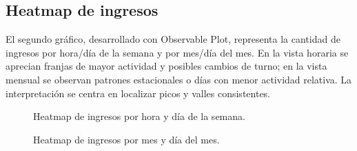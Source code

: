 \subsection{Heatmap de ingresos}
El segundo gráfico, desarrollado con Observable Plot, representa la cantidad de ingresos por hora/día de la semana y por mes/día del mes. En la vista horaria se aprecian franjas de mayor actividad y posibles cambios de turno; en la vista mensual se observan patrones estacionales o días con menor actividad relativa. La interpretación se centra en localizar picos y valles consistentes.
\begin{figure}[H]
  \centering
  \caption{Heatmap de ingresos por hora y día de la semana.}
  \label{fig:chart-heat-1}
\end{figure}
\begin{figure}[H]
  \centering
  \caption{Heatmap de ingresos por mes y día del mes.}
  \label{fig:chart-heat-2}
\end{figure}

